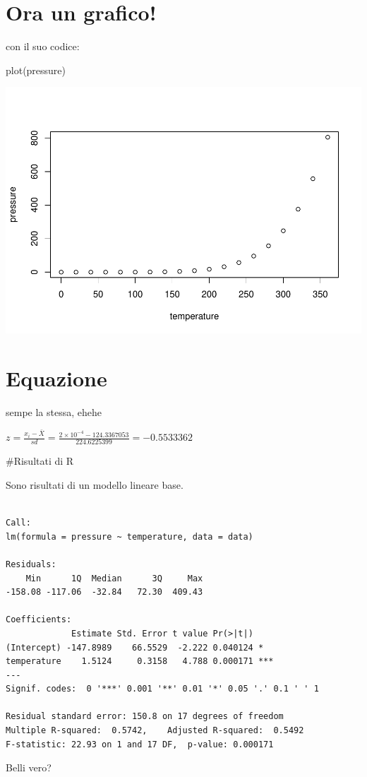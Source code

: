 \documentclass[
]{article}
\newenvironment{Shaded}{\begin{snugshade}}{\end{snugshade}}
\newcommand{\FunctionTok}[1]{\textcolor[rgb]{0.00,0.00,0.00}{#1}}
\newcommand{\NormalTok}[1]{#1}
\begin{document}
\clearpage

\hypertarget{ora-un-grafico}{%
\section{Ora un grafico!}\label{ora-un-grafico}}

con il suo codice:

\begin{Shaded}
\begin{Highlighting}[]
\FunctionTok{plot}\NormalTok{(pressure)}
\end{Highlighting}
\end{Shaded}

\begin{center}\includegraphics{final_files/figure-latex/unnamed-chunk-2-1} \end{center}

\hypertarget{equazione}{%
\section{Equazione}\label{equazione}}

sempe la stessa, ehehe

\(z = \frac{x_i - \bar{X}}{sd} = \frac{\ensuremath{2\times 10^{-4}}- 124.3367053}{224.6225399 } = -0.5533362\)

\clearpage

\#Risultati di R

Sono risultati di un modello lineare base.

\begin{verbatim}

Call:
lm(formula = pressure ~ temperature, data = data)

Residuals:
    Min      1Q  Median      3Q     Max 
-158.08 -117.06  -32.84   72.30  409.43 

Coefficients:
             Estimate Std. Error t value Pr(>|t|)    
(Intercept) -147.8989    66.5529  -2.222 0.040124 *  
temperature    1.5124     0.3158   4.788 0.000171 ***
---
Signif. codes:  0 '***' 0.001 '**' 0.01 '*' 0.05 '.' 0.1 ' ' 1

Residual standard error: 150.8 on 17 degrees of freedom
Multiple R-squared:  0.5742,    Adjusted R-squared:  0.5492 
F-statistic: 22.93 on 1 and 17 DF,  p-value: 0.000171
\end{verbatim}

Belli vero?
\end{document}
